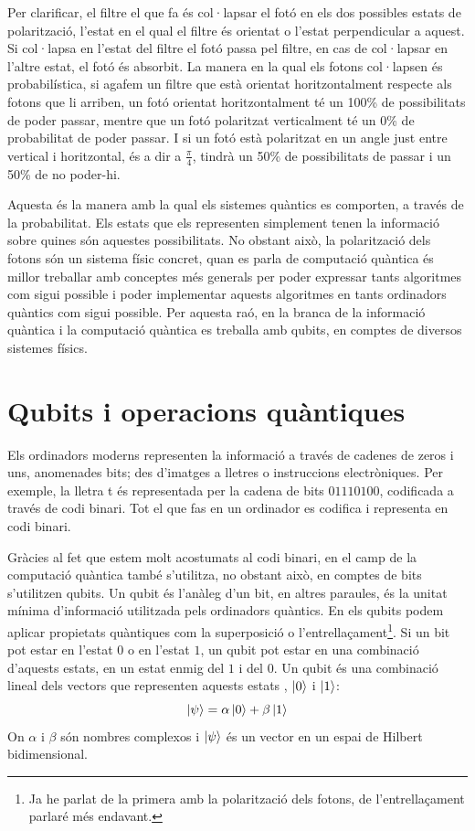 Per clarificar, el filtre el que fa és col·lapsar el fotó en els dos possibles estats de polarització, l'estat en el qual el filtre és orientat o l'estat perpendicular a aquest. Si col·lapsa en l'estat del filtre el fotó passa pel filtre, en cas de col·lapsar en l'altre estat, el fotó és absorbit. La manera en la qual els fotons col·lapsen és probabilística, si agafem un filtre que està orientat horitzontalment respecte als fotons que li arriben, un fotó orientat horitzontalment té un 100\% de possibilitats de poder passar, mentre que un fotó polaritzat verticalment té un 0\% de probabilitat de poder passar. I si un fotó està polaritzat en un angle just entre vertical i horitzontal, és a dir a $\frac{\pi}{4}$, tindrà un 50\% de possibilitats de passar i un 50\% de no poder-hi.

Aquesta és la manera amb la qual els sistemes quàntics es comporten, a través de la probabilitat. Els estats que els representen simplement tenen la informació sobre quines són aquestes possibilitats.
No obstant això, la polarització dels fotons són un sistema físic concret, quan es parla de computació quàntica és millor treballar amb conceptes més generals per poder expressar tants algoritmes com sigui possible i poder implementar aquests algoritmes en tants ordinadors quàntics com sigui possible. Per aquesta raó, en la branca de la informació quàntica i la computació quàntica es treballa amb qubits, en comptes de diversos sistemes físics.

\section{Qubits i operacions quàntiques}
Els ordinadors moderns representen la informació a través de cadenes de zeros i uns, anomenades bits; des d'imatges a lletres o instruccions electròniques. Per exemple, la lletra t és representada per la cadena de bits $01110100$, codificada a través de codi binari. Tot el que fas en un ordinador es codifica i representa en codi binari.

Gràcies al fet que estem molt acostumats al codi binari, en el camp de la computació quàntica també s'utilitza, no obstant això, en comptes de bits s'utilitzen qubits. Un qubit és l'anàleg d'un bit, en altres paraules, és la unitat mínima d'informació utilitzada pels ordinadors quàntics. En els qubits podem aplicar propietats quàntiques com la superposició o l'entrellaçament\footnote{Ja he parlat de la primera amb la polarització dels fotons, de l'entrellaçament parlaré més endavant.}. Si un bit pot estar en l'estat $0$ o en l'estat $1$, un qubit pot estar en una combinació d'aquests estats, en un estat enmig del $1$ i del $0$. Un qubit és una combinació lineal dels vectors que representen aquests estats \cite{QCandQI:qubit}, $\ket{0}$ i $\ket{1}$:
$$
\ket{\psi} = \alpha\ket{0} + \beta\ket{1}
$$
On $\alpha$ i $\beta$ són nombres complexos i $\ket{\psi}$ és un vector en un espai de Hilbert bidimensional.

